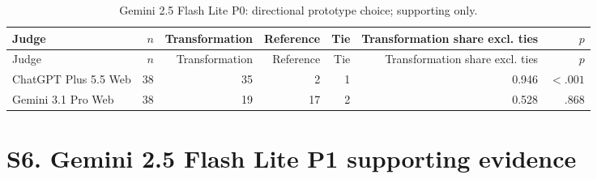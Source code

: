 \documentclass[10pt]{article}
\begin{document}
\small
\begin{longtable}{lrrrrrr}
\caption{Gemini 2.5 Flash Lite P0: directional prototype choice; supporting only.}\label{tab:s8-pref25p0}\\
\toprule Judge & $n$ & Transformation & Reference & Tie & Transformation share excl. ties & $p$ \\ \midrule\endfirsthead
\toprule Judge & $n$ & Transformation & Reference & Tie & Transformation share excl. ties & $p$ \\ \midrule\endhead
\bottomrule\endfoot
ChatGPT Plus 5.5 Web & 38 & 35 & 2 & 1 & 0.946 & $<.001$ \\
Gemini 3.1 Pro Web & 38 & 19 & 17 & 2 & 0.528 & .868 \\
\end{longtable}
\section*{S6. Gemini 2.5 Flash Lite P1 supporting evidence}
\end{document}
